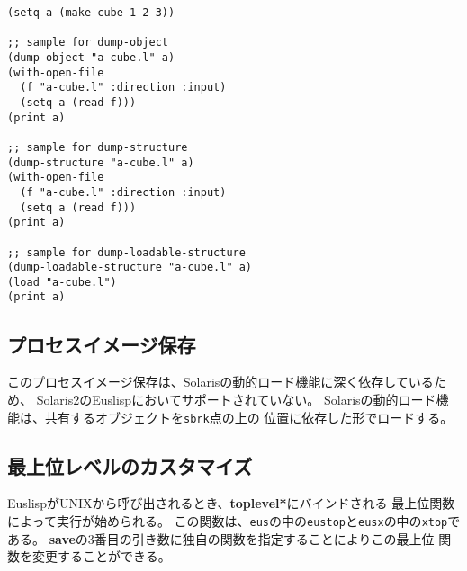 \begin{verbatim}
(setq a (make-cube 1 2 3))

;; sample for dump-object
(dump-object "a-cube.l" a)
(with-open-file
  (f "a-cube.l" :direction :input)
  (setq a (read f)))
(print a)

;; sample for dump-structure
(dump-structure "a-cube.l" a)
(with-open-file
  (f "a-cube.l" :direction :input)
  (setq a (read f)))
(print a)

;; sample for dump-loadable-structure
(dump-loadable-structure "a-cube.l" a)
(load "a-cube.l")
(print a)
\end{verbatim}

\subsection{プロセスイメージ保存}
このプロセスイメージ保存は、Solarisの動的ロード機能に深く依存しているため、
Solaris2のEuslispにおいてサポートされていない。
Solarisの動的ロード機能は、共有するオブジェクトを{\tt sbrk}点の上の
位置に依存した形でロードする。

\begin{refdesc}


\end{refdesc}

\subsection{最上位レベルのカスタマイズ}
EuslispがUNIXから呼び出されるとき、{\bf *toplevel*}にバインドされる
最上位関数によって実行が始められる。
この関数は、{\tt eus}の中の{\tt eustop}と{\tt eusx}の中の{\tt xtop}である。
{\bf save}の3番目の引き数に独自の関数を指定することによりこの最上位
関数を変更することができる。

